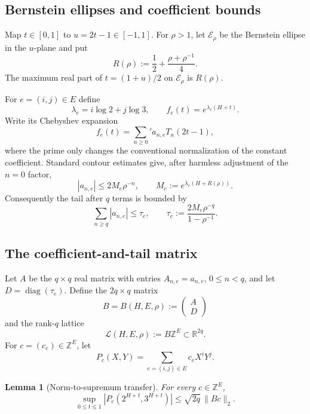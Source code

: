 \documentclass[11pt,oneside]{article}
\newtheorem{lemma}[theorem]{Lemma}
\theoremstyle{definition}
\theoremstyle{remark}
\newcommand{\Z}{\mathbb Z}
\newcommand{\R}{\mathbb R}
\newcommand{\cL}{\mathcal L}
\begin{document}
\subsection{Bernstein ellipses and coefficient bounds}

Map $t\in[0,1]$ to $u=2t-1\in[-1,1]$.  For $\rho>1$, let $\mathscr E_\rho$ be the Bernstein
ellipse in the $u$-plane and put
\begin{equation}
 R(\rho):=\frac12+\frac{\rho+\rho^{-1}}4.
 \label{eq:Rrho}
\end{equation}
The maximum real part of $t=(1+u)/2$ on $\mathscr E_\rho$ is $R(\rho)$.

For $e=(i,j)\in E$ define
\[
 \lambda_e=i\log2+j\log3,
 \qquad
 f_e(t)=e^{\lambda_e(H+t)}.
\]
Write its Chebyshev expansion
\[
 f_e(t)=\sum_{n\ge0}' a_{n,e}T_n(2t-1),
\]
where the prime only changes the conventional normalization of the constant coefficient.
Standard contour estimates give, after harmless adjustment of the $n=0$ factor,
\begin{equation}
 |a_{n,e}|\le 2M_e\rho^{-n},
 \qquad
 M_e:=e^{\lambda_e(H+R(\rho))}.
 \label{eq:cheb-coeff-bound}
\end{equation}
Consequently the tail after $q$ terms is bounded by
\begin{equation}
 \sum_{n\ge q}|a_{n,e}|
 \le \tau_e,
 \qquad
 \tau_e:=\frac{2M_e\rho^{-q}}{1-\rho^{-1}}.
 \label{eq:tail-weight}
\end{equation}

\subsection{The coefficient-and-tail matrix}

Let $A$ be the $q\times q$ real matrix with entries $A_{n,e}=a_{n,e}$,
$0\le n<q$, and let $D=\operatorname{diag}(\tau_e)$.  Define the $2q\times q$ matrix
\begin{equation}
 B=B(H,E,\rho):=\begin{pmatrix}A\\D\end{pmatrix}
 \label{eq:Bmatrix}
\end{equation}
and the rank-$q$ lattice
\[
 \cL(H,E,\rho):=B\Z^E\subset\R^{2q}.
\]
For $c=(c_e)\in\Z^E$, let
\[
 P_c(X,Y)=\sum_{e=(i,j)\in E}c_eX^iY^j.
\]

\begin{lemma}[Norm-to-supremum transfer]
\label{lem:norm-to-sup}
For every $c\in\Z^E$,
\begin{equation}
 \sup_{0\le t\le1}|P_c(2^{H+t},3^{H+t})|
 \le \sqrt{2q}\,\|Bc\|_2.
 \label{eq:norm-to-sup}
\end{equation}
\end{lemma}
\end{document}
